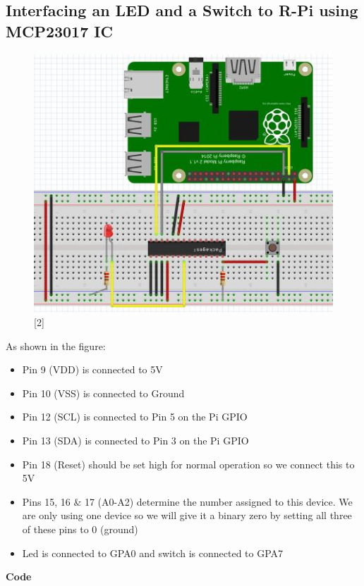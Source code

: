 \documentclass[11pt,a4paper]{article}
\begin{document}
	\subsection{Interfacing an LED and a Switch to R-Pi using MCP23017 IC}
     \begin{figure}[h!]
     	\includegraphics[scale=1]{led_switch_I2C.JPG}
     	\centering
     	\caption{[2]}
     \end{figure} 
     
     As shown in the figure:
     \begin{itemize}
     	\item Pin 9 (VDD) is connected to 5V
     	\item Pin 10 (VSS) is connected to Ground
     	\item Pin 12 (SCL) is connected to Pin 5 on the Pi GPIO
     	\item Pin 13 (SDA) is connected to Pin 3 on the Pi GPIO
     	\item Pin 18 (Reset) should be set high for normal operation so we connect this to 5V
     	\item Pins 15, 16 \& 17 (A0-A2) determine the number assigned to this device. We are only using one device so we will give it a binary zero by setting all three of these pins to 0 (ground)
     	\item Led is connected to GPA0 and switch is connected to GPA7
     \end{itemize}
    
    \newpage 
    \textbf{Code}
    \vspace{0.3cm}
    
\end{document}
